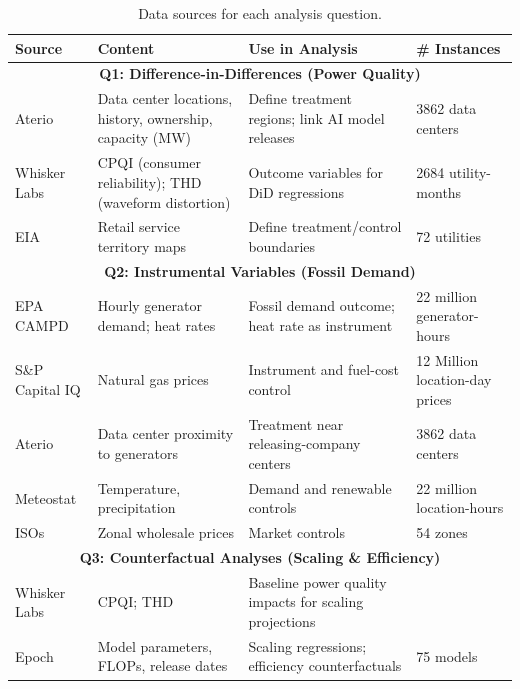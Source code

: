 \documentclass[a4paper,fleqn,longmktitle]{cas-sc}
\begin{document}
\begin{table}[htbp]
\scriptsize %
\centering
\caption{Data sources for each analysis question.}
\label{tab:DataSources}
\begin{threeparttable}
\begin{tabularx}{\linewidth}{lXXl}
\toprule
\textbf{Source} & \textbf{Content} & \textbf{Use in Analysis} & \textbf{\# Instances} \\
\midrule
\multicolumn{4}{c}{\textbf{Q1: Difference-in-Differences (Power Quality)}} \\
\midrule
Aterio & Data center locations, history, ownership, capacity (MW) & Define treatment regions; link AI model releases & 3862 data centers\\
Whisker Labs & CPQI (consumer reliability); THD (waveform distortion) & Outcome variables for DiD regressions & 2684 utility-months\\
EIA & Retail service territory maps & Define treatment/control boundaries & 72 utilities\\
\midrule
\multicolumn{4}{c}{\textbf{Q2: Instrumental Variables (Fossil Demand)}} \\
\midrule
EPA CAMPD & Hourly generator demand; heat rates & Fossil demand outcome; heat rate as instrument & 22 million generator-hours\\
S\&P Capital IQ & Natural gas prices & Instrument and fuel-cost control &12 Million location-day prices \\
Aterio & Data center proximity to generators & Treatment near releasing-company centers & 3862 data centers\\
Meteostat & Temperature, precipitation & Demand and renewable controls & 22 million location-hours\\
ISOs & Zonal wholesale prices & Market controls & 54 zones\\
\midrule
\multicolumn{4}{c}{\textbf{Q3: Counterfactual Analyses (Scaling \& Efficiency)}} \\
\midrule
Whisker Labs & CPQI; THD & Baseline power quality impacts for scaling projections & \\
Epoch & Model parameters, FLOPs, release dates & Scaling regressions; efficiency counterfactuals & 75 models\\
\bottomrule
\end{tabularx}
\end{threeparttable}
\end{table}
\end{document}
